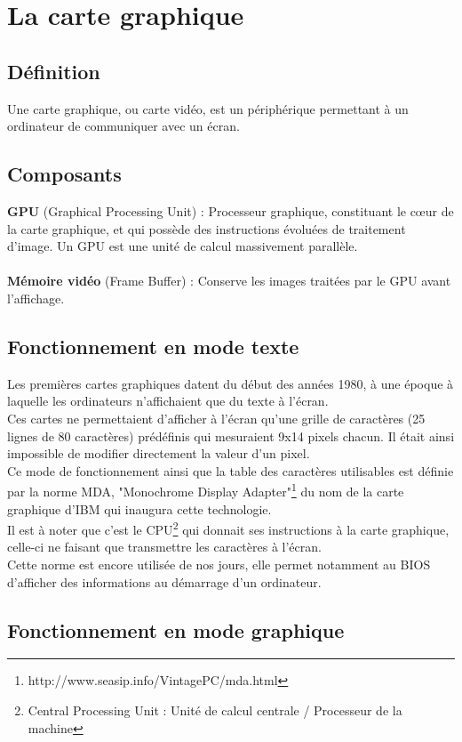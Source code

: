 \section{La carte graphique}
\subsection{Définition}
Une carte graphique, ou carte vidéo, est un périphérique permettant à un ordinateur de communiquer 
avec un écran.\\
\subsection{Composants}
\textbf{GPU} (Graphical Processing Unit) : Processeur graphique, constituant le cœur de la carte graphique, et qui possède des instructions évoluées de traitement d’image. Un GPU est une unité de calcul massivement parallèle.\\\\
\textbf{Mémoire vidéo} (Frame Buffer) : Conserve les images traitées par le GPU avant l’affichage.
\subsection{Fonctionnement en mode texte}
Les premières cartes graphiques datent du début des années 1980, à une époque à laquelle les ordinateurs n'affichaient que du texte à l'écran.\\
Ces cartes ne permettaient d'afficher à l'écran qu'une grille de caractères 
(25 lignes de 80 caractères) prédéfinis qui mesuraient 9x14 pixels chacun. Il était ainsi impossible de modifier directement la valeur d'un pixel.\\
Ce mode de fonctionnement ainsi que la table des caractères utilisables est 
définie par la norme MDA, "Monochrome Display Adapter"\footnote{http://www.seasip.info/VintagePC/mda.html}
du nom de la carte graphique d'IBM qui inaugura cette technologie.\\
Il est à noter que c'est le CPU\footnote{Central Processing Unit : Unité de calcul centrale / Processeur de la machine} qui donnait ses instructions à la carte graphique, celle-ci ne faisant que transmettre les caractères à l'écran.\\
Cette norme est encore utilisée de nos jours, elle permet notamment au BIOS d'afficher des informations au démarrage d'un ordinateur.

\subsection{Fonctionnement en mode graphique}

